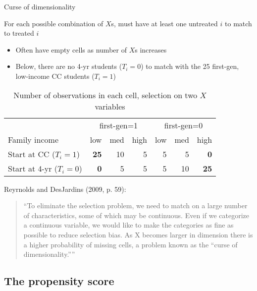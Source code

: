 \begin{frame}[shrink=10]{Curse of dimensionality}

	For each possible combination of $X$s, must have at least one untreated $i$ to match to treated $i$
	\begin{itemize}
		\item Often have empty cells as number of $X$s increases
		\item Below, there are no 4-yr students ($T_i=0$) to match with the 25 first-gen, low-income CC students ($T_i=1$)
	\end{itemize}
	
	
	\begin{table}
	\begin{tabular}{l | r r r | r r r}
		\hline & \multicolumn{3}{c}{first-gen=1}  & \multicolumn{3}{c}{first-gen=0} \\ 
		Family income & low & med & high & low & med & high \\ \hline	
		Start at CC ($T_i=1$) &  \textbf{25} & 10 & 5 & 5 & 5 & \textbf{0} \\ \hline
		Start at 4-yr ($T_i=0$) & \textbf{0} & 5 & 5 & 5 & 10 & \textbf{25} \\ \hline
	\end{tabular}
	\caption{Number of observations in each cell, selection on two $X$ variables}
	\end{table}
	
	
	Reyrnolds and DesJardins (2009, p. 59):
	{\scriptsize
		\begin{quote} ``To eliminate the selection problem, we need to match on a large number of characteristics, some of which may be continuous. Even if we categorize a continuous variable, we would like to make the categories as fine as possible to reduce selection bias. As X becomes larger in dimension there is a higher probability of missing cells, a problem known as the “curse of dimensionality.”''  \end{quote}
		}
			
\end{frame}

\subsection[Cure]{The propensity score}

